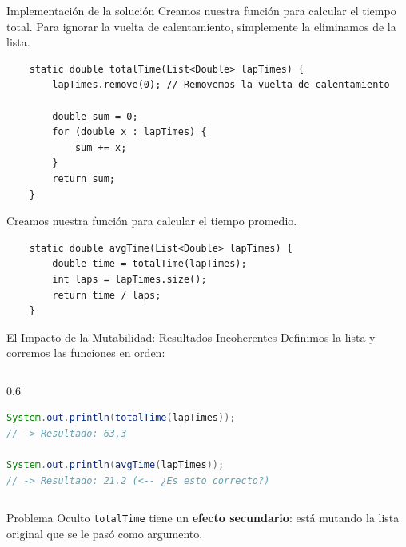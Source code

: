 \documentclass{beamer}
\begin{document}
\begin{frame}[fragile]{Implementación de la solución}
    Creamos nuestra función para calcular el tiempo total. Para ignorar la vuelta de calentamiento, simplemente la eliminamos de la lista.

    \begin{lstlisting}
    static double totalTime(List<Double> lapTimes) {
        lapTimes.remove(0); // Removemos la vuelta de calentamiento
        
        double sum = 0;
        for (double x : lapTimes) {
            sum += x;
        }
        return sum;
    }
    \end{lstlisting}

       Creamos nuestra función para calcular el tiempo promedio.

    \begin{lstlisting}
    static double avgTime(List<Double> lapTimes) {
        double time = totalTime(lapTimes);
        int laps = lapTimes.size();
        return time / laps;
    }
    \end{lstlisting}

    
\end{frame}

\begin{frame}[fragile]{El Impacto de la Mutabilidad: Resultados Incoherentes}
    Definimos la lista y corremos las funciones en orden:
    \begin{columns}
        \begin{column}{0.6\textwidth}
            \begin{lstlisting}[language=Java, title={Ejecución secuencial}]
System.out.println(totalTime(lapTimes));
// -> Resultado: 63,3

System.out.println(avgTime(lapTimes));
// -> Resultado: 21.2 (<-- ¿Es esto correcto?)
            \end{lstlisting}
        \end{column}
    \end{columns}

    \begin{alertblock}{Problema Oculto}
        \texttt{totalTime} tiene un \textbf{efecto secundario}: está mutando la lista original que se le pasó como argumento.
    \end{alertblock}
\end{frame}
\end{document}
